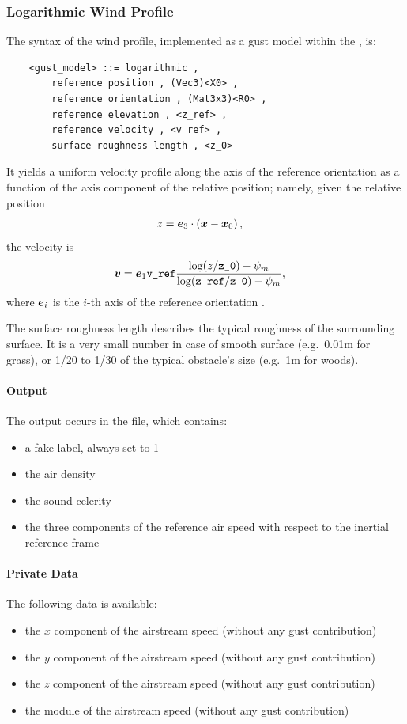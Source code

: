 \subsubsection{Logarithmic Wind Profile}
The syntax of the  wind profile, implemented as a gust model
within the , is:
\begin{verbatim}
    <gust_model> ::= logarithmic ,
        reference position , (Vec3)<X0> ,
        reference orientation , (Mat3x3)<R0> ,
        reference elevation , <z_ref> ,
        reference velocity , <v_ref> ,
        surface roughness length , <z_0>
\end{verbatim}
It yields a uniform velocity profile along the  axis of the
reference orientation as a function of the  axis component
of the relative position; namely, given the relative position
\begin{align}
	z &= \boldsymbol{e}_3 \cdot \left( \boldsymbol{x} - \boldsymbol{x}_0 \right)
	,
\end{align}
the velocity is
\begin{align}
	\boldsymbol{v}
	&=
	\boldsymbol{e}_1 \texttt{v\_ref} \frac{
		\log(z/\texttt{z\_0}) - \psi_m
	}{
		\log(\texttt{z\_ref}/\texttt{z\_0}) - \psi_m
	}
	,
\end{align}
where $\boldsymbol{e}_i$ is the $i$-th axis of the reference orientation .

The surface roughness length describes the typical roughness
of the surrounding surface.
It is a very small number in case of smooth surface
(e.g.\ 0.01m for grass),
or 1/20 to 1/30 of the typical obstacle's size (e.g.\ 1m for woods).


\paragraph{Output}
The output occurs in the  file, which contains:
\begin{itemize}
\item a fake label, always set to 1
\item the air density
\item the sound celerity
\item the three components of the reference air speed
with respect to the inertial reference frame
\end{itemize}


\paragraph{Private Data}
The following data is available:
\begin{itemize}
\item {} the $x$ component of the airstream speed (without any gust contribution)
\item {} the $y$ component of the airstream speed (without any gust contribution)
\item {} the $z$ component of the airstream speed (without any gust contribution)
\item {} the module of the airstream speed (without any gust contribution)
\end{itemize}

